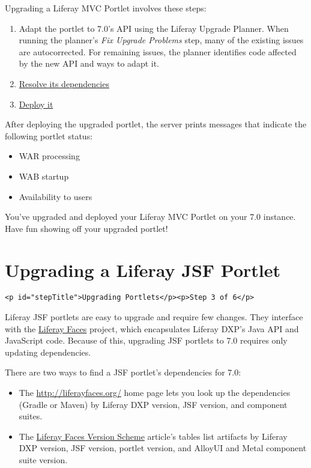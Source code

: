 Upgrading a Liferay MVC Portlet involves these steps:

\begin{enumerate}
\def\labelenumi{\arabic{enumi}.}
\item
  Adapt the portlet to 7.0's API using the Liferay Upgrade Planner. When
  running the planner's \emph{Fix Upgrade Problems} step, many of the
  existing issues are autocorrected. For remaining issues, the planner
  identifies code affected by the new API and ways to adapt it.
\item
  \href{/docs/7-2/tutorials/-/knowledge_base/t/resolving-a-projects-dependencies}{Resolve
  its dependencies}
\item
  \href{/docs/7-2/reference/-/knowledge_base/r/deploying-a-project}{Deploy
  it}
\end{enumerate}

After deploying the upgraded portlet, the server prints messages that
indicate the following portlet status:

\begin{itemize}
\tightlist
\item
  WAR processing
\item
  WAB startup
\item
  Availability to users
\end{itemize}

You've upgraded and deployed your Liferay MVC Portlet on your 7.0
instance. Have fun showing off your upgraded portlet!

\chapter{Upgrading a Liferay JSF
Portlet}\label{upgrading-a-liferay-jsf-portlet}

\begin{verbatim}
<p id="stepTitle">Upgrading Portlets</p><p>Step 3 of 6</p>
\end{verbatim}

Liferay JSF portlets are easy to upgrade and require few changes. They
interface with the
\href{/docs/7-2/reference/-/knowledge_base/r/liferay-faces}{Liferay
Faces} project, which encapsulates Liferay DXP's Java API and JavaScript
code. Because of this, upgrading JSF portlets to 7.0 requires only
updating dependencies.

There are two ways to find a JSF portlet's dependencies for 7.0:

\begin{itemize}
\tightlist
\item
  The \url{http://liferayfaces.org/} home page lets you look up the
  dependencies (Gradle or Maven) by Liferay DXP version, JSF version,
  and component suites.
\item
  The
  \href{/docs/7-2/reference/-/knowledge_base/r/liferay-faces-version-scheme}{Liferay
  Faces Version Scheme} article's tables list artifacts by Liferay DXP
  version, JSF version, portlet version, and AlloyUI and Metal component
  suite version.
\end{itemize}

